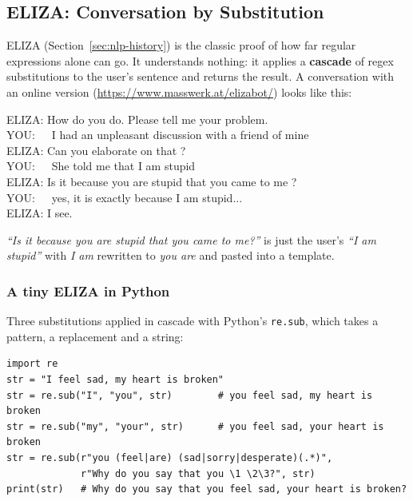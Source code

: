 \subsection{ELIZA: Conversation by Substitution}
\label{sec:eliza}

ELIZA (Section~\ref{sec:nlp-history}) is the classic proof of how far regular
expressions alone can go. It understands nothing: it applies a \textbf{cascade} of
regex substitutions to the user's sentence and returns the result. A conversation with
an online version (\url{https://www.masswerk.at/elizabot/}) looks like this:

\begin{center}
\begin{minipage}{0.85\linewidth}
\small\ttfamily
ELIZA: How do you do. Please tell me your problem.\\
YOU:\ \ \ I had an unpleasant discussion with a friend of mine\\
ELIZA: Can you elaborate on that ?\\
YOU:\ \ \ She told me that I am stupid\\
ELIZA: Is it because you are stupid that you came to me ?\\
YOU:\ \ \ yes, it is exactly because I am stupid...\\
ELIZA: I see.
\end{minipage}
\end{center}

\emph{``Is it because you are stupid that you came to me?''} is just the user's
\emph{``I am stupid''} with \emph{I am} rewritten to \emph{you are} and pasted into a
template.

\subsubsection{A tiny ELIZA in Python}

Three substitutions applied in cascade with Python's \texttt{re.sub}, which takes a
pattern, a replacement and a string:

\begin{verbatim}
import re
str = "I feel sad, my heart is broken"
str = re.sub("I", "you", str)        # you feel sad, my heart is broken
str = re.sub("my", "your", str)      # you feel sad, your heart is broken
str = re.sub(r"you (feel|are) (sad|sorry|desperate)(.*)",
             r"Why do you say that you \1 \2\3?", str)
print(str)   # Why do you say that you feel sad, your heart is broken?
\end{verbatim}

